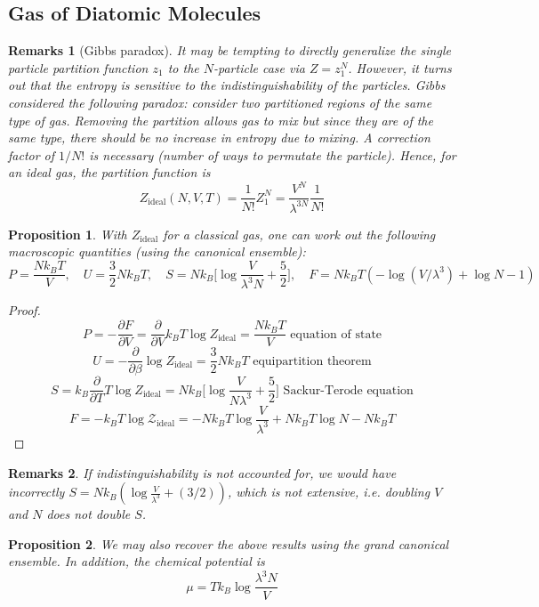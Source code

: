 \documentclass[a4paper]{article}
\newtheorem{remarks}{Remarks}[section]
\theoremstyle{new}
\newtheorem{prop}{Proposition}[section]
\begin{document}
\subsection{Gas of Diatomic Molecules}
\begin{remarks}[Gibbs paradox]
It may be tempting to directly generalize the single particle partition function $z_1$ to the $N$-particle case via $Z=z_1^N$. However, it turns out that the entropy is sensitive to the indistinguishability of the particles. Gibbs considered the following paradox: consider two partitioned regions of the same type of gas. Removing the partition allows gas to mix but since they are of the same type, there should be no increase in entropy due to mixing. A correction factor of $1/N!$ is necessary (number of ways to permutate the particle). Hence, for an ideal gas, the partition function is
\begin{equation}
Z_{\text{ideal}}(N,V,T)=\frac{1}{N!}Z_1^N=\frac{V^N}{\lambda^{3N}}\frac{1}{N!}\label{Gibbsparadox}
\end{equation}
\end{remarks}
\begin{prop}
With $Z_{\text{ideal}}$ for a classical gas, one can work out the following macroscopic quantities (using the canonical ensemble):
\begin{equation}
P=\frac{Nk_BT}{V},\quad U=\frac{3}{2}Nk_BT,\quad S=Nk_B\bigg[\log\frac{V}{\lambda^3N}+\frac{5}{2}\bigg],\quad F=Nk_BT(-\log(V/\lambda^3)+\log N-1)\label{ideal2}
\end{equation}
\end{prop}
\begin{proof}
$$P=-\frac{\partial F}{\partial V}=\frac{\partial}{\partial V}k_BT\log Z_{\text{ideal}}=\frac{Nk_BT}{V}\text{ equation of state}$$
$$U=-\frac{\partial}{\partial\beta}\log Z_{\text{ideal}}=\frac{3}{2}Nk_BT\text{ equipartition theorem}$$
$$S=k_B\frac{\partial}{\partial T}T\log Z_{\text{ideal}}=Nk_B\bigg[\log\frac{V}{N\lambda^3}+\frac{5}{2}\bigg]\text{ Sackur-Terode equation}$$
$$F=-k_BT\log\mathcal{Z}_{\text{ideal}}=-Nk_BT\log\frac{V}{\lambda^3}+Nk_BT\log N-Nk_BT$$
\end{proof}
\begin{remarks}
If indistinguishability is not accounted for, we would have incorrectly $S=Nk_B(\log\frac{V}{\lambda^3}+(3/2))$, which is not extensive, i.e. doubling $V$ and $N$ does not double $S$.
\end{remarks}
\begin{prop}
We may also recover the above results using the grand canonical ensemble. In addition, the chemical potential is
\begin{equation}
\mu=Tk_B\log\frac{\lambda^3N}{V}\label{ideal3}
\end{equation}
\end{prop}
\end{document}

